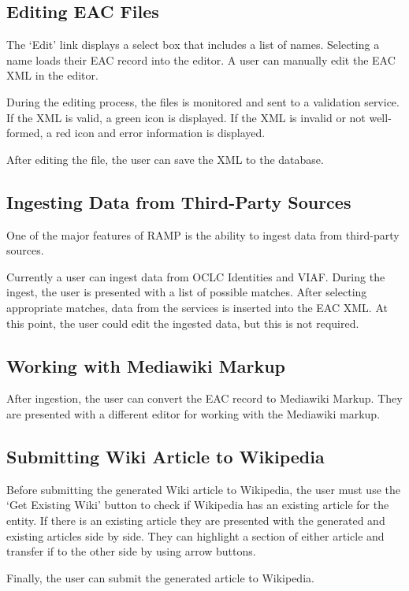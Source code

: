 \documentclass[11pt]{article}
\begin{document}
\subsection{Editing EAC Files}
\label{sec-2-3}

   The `Edit' link displays a select box that includes a list of names. Selecting a name loads their EAC record into the editor. A user can manually edit the EAC XML in the editor. 
   
   During the editing process, the files is monitored and sent to a validation service. If the XML is valid, a green icon is displayed. If the XML is invalid or not well-formed, a red icon 
   and error information is displayed. 

   After editing the file, the user can save the XML to the database.
\subsection{Ingesting Data from Third-Party Sources}
\label{sec-2-4}

   One of the major features of RAMP is the ability to ingest data from third-party sources. 

   Currently a user can ingest data from OCLC Identities and VIAF. During the ingest, 
   the user is presented with a list of possible matches. After selecting appropriate matches, data from the services is inserted into the EAC XML. At this point, the user could
   edit the ingested data, but this is not required. 
\subsection{Working with Mediawiki Markup}
\label{sec-2-5}

   After ingestion, the user can convert the EAC record to Mediawiki Markup. They are presented with a different editor for working with the Mediawiki markup. 
\subsection{Submitting Wiki Article to Wikipedia}
\label{sec-2-6}

   Before submitting the generated Wiki article to Wikipedia, the user must use the `Get Existing Wiki' button to check if Wikipedia has an existing article for the entity. If there 
   is an existing article they are presented with the generated and existing articles side by side. They can highlight a section of either article and transfer if to the other side
   by using arrow buttons. 

   Finally, the user can submit the generated article to Wikipedia. 
\end{document}

